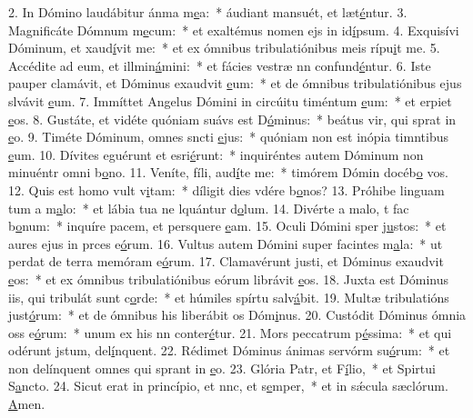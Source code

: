 2. In Dómino laudábitur ánma m\uline{e}a:~* áudiant mansuét, et læt\uline{é}ntur.
3. Magnificáte Dómnum m\uline{e}cum:~* et exaltémus nomen ejs in id\uline{í}psum.
4. Exquisívi Dóminum, et xaud\uline{í}vit me:~* et ex ómnibus tribulatiónibus meis rípu\uline{i}t me.
5. Accédite ad eum, et illmin\uline{á}mini:~* et fácies vestræ nn confund\uline{é}ntur.
6. Iste pauper clamávit, et Dóminus exaudvit \uline{e}um:~* et de ómnibus tribulatiónibus ejus slvávit \uline{e}um.
7. Immíttet Angelus Dómini in circúitu timéntum \uline{e}um:~* et erpiet \uline{e}os.
8. Gustáte, et vidéte quóniam suávs est D\uline{ó}minus:~* beátus vir, qui sprat in \uline{e}o.
9. Timéte Dóminum, omnes sncti \uline{e}jus:~* quóniam non est inópia timntibus \uline{e}um.
10. Dívites eguérunt et esri\uline{é}runt:~* inquiréntes autem Dóminum non minuéntr omni b\uline{o}no.
11. Veníte, fíli, aud\uline{í}te me:~* timórem Dómin docéb\uline{o} vos.
12. Quis est homo  vult v\uline{i}tam:~* díligit dies vdére b\uline{o}nos?
13. Próhibe linguam tum a m\uline{a}lo:~* et lábia tua ne lquántur d\uline{o}lum.
14. Divérte a malo, t fac b\uline{o}num:~* inquíre pacem, et persquere \uline{e}am.
15. Oculi Dómini sper j\uline{u}stos:~* et aures ejus in prces e\uline{ó}rum.
16. Vultus autem Dómini super facintes m\uline{a}la:~* ut perdat de terra memóram e\uline{ó}rum.
17. Clamavérunt justi, et Dóminus exaudvit \uline{e}os:~* et ex ómnibus tribulatiónibus eórum librávit \uline{e}os.
18. Juxta est Dóminus iis, qui tribulát sunt c\uline{o}rde:~* et húmiles spírtu salv\uline{á}bit.
19. Multæ tribulatións just\uline{ó}rum:~* et de ómnibus his liberábit os Dóm\uline{i}nus.
20. Custódit Dóminus ómnia oss e\uline{ó}rum:~* unum ex his nn conter\uline{é}tur.
21. Mors peccatrum p\uline{é}ssima:~* et qui odérunt jstum, del\uline{í}nquent.
22. Rédimet Dóminus ánimas servórm su\uline{ó}rum:~* et non delínquent omnes qui sprant in \uline{e}o.
23. Glória Patr, et F\uline{í}lio,~* et Spirtui S\uline{a}ncto.
24. Sicut erat in princípio, et nnc, et s\uline{e}mper,~* et in sǽcula sæclórum. \uline{A}men.

